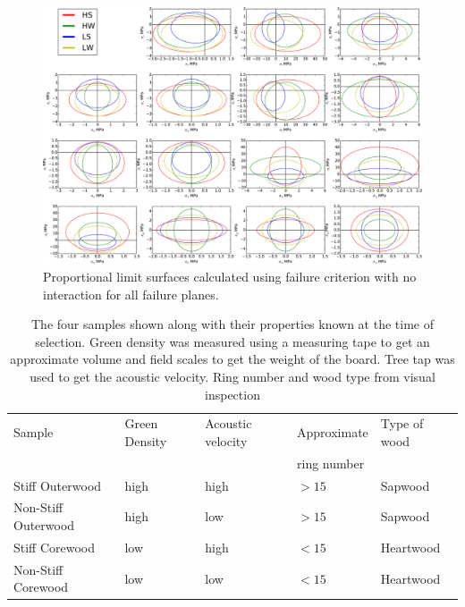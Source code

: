\documentclass[10pt]{article}
\begin{document}
\begin{figure}[!ht]
\begin{center}
\includegraphics[width=130mm,keepaspectratio]{figs/00_tw_failure.pdf}
\caption[Proportional limit sufaces, no interaction]{\label{fig:yeild, k0} Proportional limit surfaces calculated using \citet{tsai_general_1971} failure criterion with no interaction for all failure planes.
}
\end{center}
\end{figure}
%

\begin{table}\label{table:mill samples table}
\caption[Initial properties of samples]{The four samples shown along with their properties known at the time of selection. Green density was measured using a measuring tape to get an approximate volume and field scales to get the weight of the board. Tree tap was used to get the acoustic velocity. Ring number and wood type from visual inspection}
\begin{tabular}{l l l l l}
\hline
Sample & Green Density & Acoustic velocity & Approximate & Type of wood\\
       &               &                   & ring number &              \\
\hline
Stiff Outerwood& high & high & \(>15\) & Sapwood\\
Non-Stiff Outerwood& high & low & \(>15\) & Sapwood\\
Stiff Corewood& low & high & \(<15\) & Heartwood\\
Non-Stiff Corewood& low & low & \(<15\) & Heartwood\\
\hline
\end{tabular}
\end{table}
\end{document}
